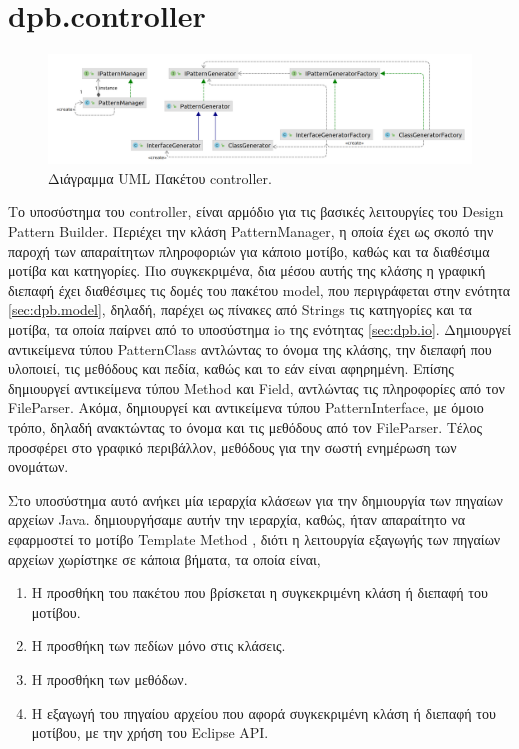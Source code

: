 \section{dpb.controller}
\label{sec:dpb.controller}
\begin{figure}[H]
    \centering
    \includegraphics[width=1.0\textwidth]{Figures/controller.png}
    \caption{Διάγραμμα UML Πακέτου controller.}
    \label{fig:controllerUML}
\end{figure}
\par
Το υποσύστημα του controller, είναι αρμόδιο για τις βασικές λειτουργίες του Design Pattern Builder. Περιέχει την κλάση PatternManager, 
η οποία έχει ως σκοπό την παροχή των απαραίτητων πληροφοριών για κάποιο μοτίβο, καθώς και τα διαθέσιμα μοτίβα και κατηγορίες. 
Πιο συγκεκριμένα, δια μέσου αυτής της κλάσης η γραφική διεπαφή έχει διαθέσιμες τις δομές του πακέτου model, που 
περιγράφεται στην ενότητα \ref{sec:dpb.model}, δηλαδή, παρέχει ως πίνακες από Strings τις κατηγορίες και τα μοτίβα, τα οποία παίρνει 
από το υποσύστημα io της ενότητας \ref{sec:dpb.io}. Δημιουργεί αντικείμενα τύπου PatternClass αντλώντας το όνομα της κλάσης, 
την διεπαφή που υλοποιεί, τις μεθόδους και πεδία, καθώς και το εάν είναι αφηρημένη. Επίσης δημιουργεί αντικείμενα τύπου Method και Field, 
αντλώντας τις πληροφορίες από τον FileParser. Ακόμα, δημιουργεί και αντικείμενα τύπου PatternInterface, με όμοιο τρόπο, 
δηλαδή ανακτώντας το όνομα και τις μεθόδους από τον FileParser. 
Τέλος προσφέρει στο γραφικό περιβάλλον, μεθόδους για την σωστή ενημέρωση των ονομάτων.
\par
Στο υποσύστημα αυτό ανήκει μία ιεραρχία κλάσεων για την δημιουργία των πηγαίων αρχείων Java. δημιουργήσαμε αυτήν την ιεραρχία, καθώς,
ήταν απαραίτητο να εφαρμοστεί το μοτίβο Template Method \cite{GoF}, διότι η λειτουργία εξαγωγής των πηγαίων αρχείων χωρίστηκε σε κάποια βήματα, τα οποία είναι,
\newline
\begin{enumerate}
    \item Η προσθήκη του πακέτου που βρίσκεται η συγκεκριμένη κλάση ή διεπαφή του μοτίβου.
    \item Η προσθήκη των πεδίων μόνο στις κλάσεις. \label{enum:fields}
    \item Η προσθήκη των μεθόδων. \label{enum:methods}
    \item Η εξαγωγή του πηγαίου αρχείου που αφορά συγκεκριμένη κλάση ή διεπαφή του μοτίβου, με την χρήση του Eclipse API.
\end{enumerate}
